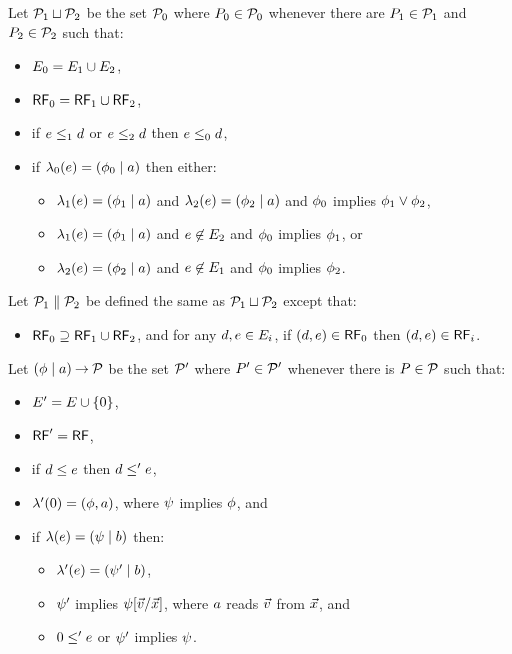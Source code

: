 Let $\mathcal{P}_1 \sqcup \mathcal{P}_2$ be the set $\mathcal{P}_0$ where $P_0 \in \mathcal{P}_0$
whenever there are $P_1 \in \mathcal{P}_1$ and  $P_2 \in \mathcal{P}_2$ such that:
\begin{itemize}
\item $E_0 = E_1 \cup E_2$,
\item $\mathsf{RF}_0 = \mathsf{RF}_1 \cup \mathsf{RF}_2$,
\item if $e \le_1 d$ or $e \le_2 d$ then $e \le_0 d$,
\item if $\lambda_0(e) = (\phi_0 \mid a)$ then either:
  \begin{itemize}
  \item $\lambda_1(e) = (\phi_1 \mid a)$ and $\lambda_2(e) = (\phi_2 \mid a)$
    and $\phi_0$ implies $\phi_1 \lor \phi_2$,
  \item $\lambda_1(e) = (\phi_1 \mid a)$ and $e \not\in E_2$
    and $\phi_0$ implies $\phi_1$, or
  \item $\lambda_2(e) = (\phi_2 \mid a)$ and $e \not\in E_1$
    and $\phi_0$ implies $\phi_2$.
  \end{itemize}
\end{itemize}
Let $\mathcal{P}_1 \parallel \mathcal{P}_2$ be defined the same as $\mathcal{P}_1 \sqcup \mathcal{P}_2$ except that:
\begin{itemize}
\item $\mathsf{RF}_0 \supseteq \mathsf{RF}_1 \cup \mathsf{RF}_2$, and
 for any $d, e \in E_i$, if $(d,e)\in\mathsf{RF}_0$ then $(d,e)\in\mathsf{RF}_i$.
\end{itemize}
Let $(\phi \mid a) \mathbin\rightarrow \mathcal{P}$ be the set $\mathcal{P}'$ where $P'\in\mathcal{P}'$ whenever
there is $P\in\mathcal{P}$ such that:
\begin{itemize}
\item $E' = E \cup \{0\}$,
\item $\mathsf{RF}' = \mathsf{RF}$,
\item if $d \le e$ then $d \le' e$,
\item $\lambda'(0) = (\phi, a)$, where $\psi$ implies $\phi$, and
\item if $\lambda(e) = (\psi \mid b)$ then:
  \begin{itemize}
  \item $\lambda'(e) = (\psi' \mid b)$,
  \item $\psi'$ implies $\psi[\vec{v}/\vec{x}]$, where $a$ reads $\vec{v}$ from $\vec{x}$, and
  \item $0 \le' e$ or $\psi'$ implies $\psi$.
  \end{itemize}
\end{itemize}
